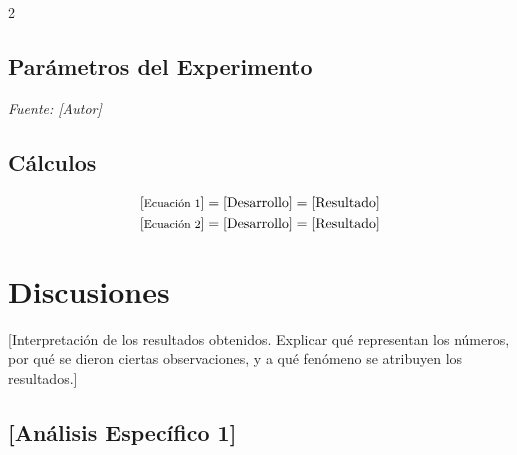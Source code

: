 \documentclass[12pt, a4paper]{article}
\begin{document}
\begin{multicols}{2}
\subsection{Parámetros del Experimento}

\begin{table}[H]
    \centering
    \caption{[Título de la tabla de parámetros]}
    \label{tab:parametros}
    \textit{\footnotesize Fuente: [Autor]}
\end{table}

\subsection{Cálculos}

\begin{align}
\footnotesize
[\text{Ecuación 1}] &= [\text{Desarrollo}] = [\text{Resultado}] \\
\footnotesize
[\text{Ecuación 2}] &= [\text{Desarrollo}] = [\text{Resultado}]
\end{align}

\section{Discusiones}

[Interpretación de los resultados obtenidos. Explicar qué representan los números, por qué se dieron ciertas observaciones, y a qué fenómeno se atribuyen los resultados.]

\subsection{[Análisis Específico 1]}


\end{multicols}
\end{document}
